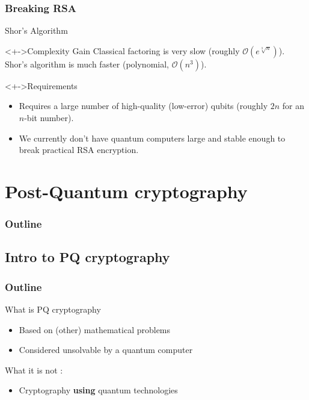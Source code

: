 \documentclass{beamer}
\begin{document}
\subsubsection*{Breaking RSA}
\begin{frame}{Shor's Algorithm}
\begin{linenumbers}
  \begin{block}<+->{Complexity Gain}
        Classical factoring is very slow (roughly $\mathcal{O}(e^{\sqrt[3]{n}})$). Shor's algorithm is much faster (polynomial, $\mathcal{O}(n^3)$).
  \end{block}
    \begin{block}<+->{Requirements}
        \begin{itemize}[<+->]
            \item Requires a large number of high-quality (low-error) qubits (roughly $2n$ for an $n$-bit number).
            \item  We currently don't have quantum computers large and stable enough to break practical RSA encryption.
        \end{itemize}
    \end{block}
\end{linenumbers}
\end{frame}

\section{Post-Quantum cryptography}
\begin{frame}
  \frametitle{Outline}
  \tableofcontents[currentsection]
\end{frame}

\subsection{Intro to PQ cryptography}
\begin{frame}
  \frametitle{Outline}
\end{frame}

\begin{frame}{What is PQ cryptography}
\begin{linenumbers}
	\begin{itemize}
		\item Based on (other) mathematical problems
		\item Considered unsolvable by a quantum computer
	\end{itemize}

	What it is not :
	\begin{itemize}
		\item Cryptography \textbf{using} quantum technologies
	\end{itemize}
\end{linenumbers}
\end{frame}
\end{document}
